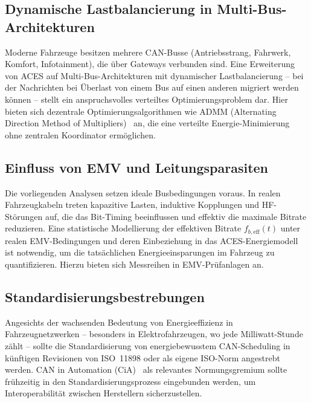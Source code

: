 ﻿\documentclass[a4paper,12pt]{article}
\theoremstyle{definition}
\begin{document}
\subsection{Dynamische Lastbalancierung in Multi-Bus-Architekturen}

Moderne Fahrzeuge besitzen mehrere CAN-Busse (Antriebsstrang, Fahrwerk, Komfort,
Infotainment), die \"{u}ber Gateways verbunden sind.
Eine Erweiterung von ACES auf Multi-Bus-Architekturen mit dynamischer
Lastbalancierung -- bei der Nachrichten bei \"{U}berlast von einem Bus auf einen
anderen migriert werden k\"{o}nnen -- stellt ein anspruchsvolles verteiltes
Optimierungsproblem dar.
Hier bieten sich dezentrale Optimierungsalgorithmen wie ADMM (Alternating Direction
Method of Multipliers)~\cite{boyd_admm} an, die eine verteilte Energie-Minimierung
ohne zentralen Koordinator erm\"{o}glichen.

\subsection{Einfluss von EMV und Leitungsparasiten}

Die vorliegenden Analysen setzen ideale Busbedingungen voraus.
In realen Fahrzeugkabeln treten kapazitive Lasten, induktive Kopplungen und
HF-St\"{o}rungen auf, die das Bit-Timing beeinflussen und effektiv die maximale
Bitrate reduzieren.
Eine statistische Modellierung der effektiven Bitrate $f_{b,\mathrm{eff}}(t)$
unter realen EMV-Bedingungen und deren Einbeziehung in das ACES-Energiemodell
ist notwendig, um die tats\"{a}chlichen Energieeinsparungen im Fahrzeug zu
quantifizieren.
Hierzu bieten sich Messreihen in EMV-Pr\"{u}fanlagen an.

\subsection{Standardisierungsbestrebungen}

Angesichts der wachsenden Bedeutung von Energieeffizienz in
Fahrzeugnetzwerken -- besonders in Elektrofahrzeugen, wo jede Milliwatt-Stunde
z\"{a}hlt -- sollte die Standardisierung von energiebewusstem CAN-Scheduling in
k\"{u}nftigen Revisionen von ISO~11898 oder als eigene ISO-Norm angestrebt werden.
CAN in Automation (CiA)~\cite{cia_spec} als relevantes Normungsgremium
sollte fr\"{u}hzeitig in den Standardisierungsprozess eingebunden werden,
um Interoperabilit\"{a}t zwischen Herstellern sicherzustellen.
\end{document}

